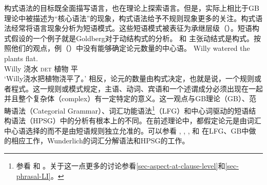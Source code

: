 \noindent
构式语法的目标既全面描写语言，也在理论上探索语言。但是，实际上相比于GB理论中被描述为“核心语法”的现象，构式语法给予不规则现象更多的关注。构式语法经常将语言现象分析为短语模式。这些短语模式被表征为承继层级（\egc \citealp{Croft2001a,Goldberg2003a}）。短语构式假设的一个例子就是Goldberg对于动结构式的分析。 \citet{Goldberg95a}和 \citet{GJ2004a}主张动结式是构式。按照他们的观点，例（）中没有能够确定论元数量的中心语。
%
\ea
\gll Willy watered the plants flat.\\
	 Willy 浇水 \textsc{det} 植物 平\\
\glt `Willy浇水把植物浇平了。'
\z
相反，论元的数量由构式决定，也就是说，一个规则或者程式。这一规则或模式规定，主语、动词、宾语和一个述谓成分必须出现在一起并且整个复杂体（complex）有一定特定的意义。这一观点与GB理论\indexgbc（GB）、范畴语法\indexcgc（Categorial Grammar）、词汇功能语法\footnote{参看 和 。关于这一点更多的讨论参看\ref{sec-aspect-at-clause-level}和\ref{sec-phrasal-LI}。%
}\indexlfgc（LFG）和中心词驱动的短语结构语法\indexhpsgc（HPSG）中的分析有根本上的不同。在前述理论中，都假定论元是由词汇中心语选择的而不是由短语规则独立允准的。可以参看 ,  ,  ,  和 在LFG、GB中做的相应工作，Wunderlich的词汇分解语法和HPSG的工作。

